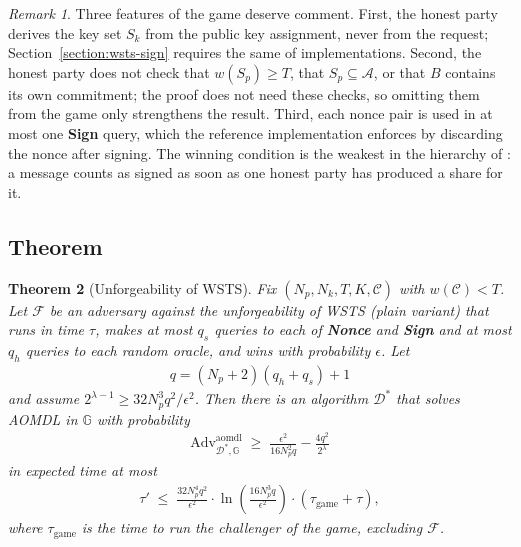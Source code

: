 \documentclass{article}
\theoremstyle{plain}
\newtheorem{thm}{Theorem}[section]
\theoremstyle{definition}
\theoremstyle{remark}
\newtheorem{rem}[thm]{Remark}
\begin{document}
\begin{rem}\label{remark:game}
  Three features of the game deserve comment.  First, the honest party derives the key set $S_k$ from the public key assignment, never from the request; Section~\ref{section:wsts-sign} requires the same of implementations.  Second, the honest party does not check that $w(S_p) \ge T$, that $S_p \subseteq \mathcal{A}$, or that $B$ contains its own commitment; the proof does not need these checks, so omitting them from the game only strengthens the result.  Third, each nonce pair is used in at most one \textbf{Sign} query, which the reference implementation enforces by discarding the nonce after signing.  The winning condition is the weakest in the hierarchy of \cite{btz22}: a message counts as signed as soon as one honest party has produced a share for it.
\end{rem}

\subsection{
  Theorem
}

\begin{thm}[Unforgeability of WSTS]\label{theorem:wsts}
  Fix $(N_p, N_k, T, K, \mathcal{C})$ with $w(\mathcal{C}) < T$.  Let $\mathcal{F}$ be an adversary against the unforgeability of WSTS (plain variant) that runs in time $\tau$, makes at most $q_s$ queries to each of \textbf{Nonce} and \textbf{Sign} and at most $q_h$ queries to each random oracle, and wins with probability $\epsilon$.  Let
  \begin{align}
    q = (N_p + 2)(q_h + q_s) + 1
  \end{align}
  and assume $2^{\lambda - 1} \ge 32 N_p^3 q^2 / \epsilon^2$.  Then there is an algorithm $\mathcal{D}^*$ that solves AOMDL in $\mathbb{G}$ with probability
  \begin{align}\label{equation:theorem-advantage}
    \mathrm{Adv}^{\mathrm{aomdl}}_{\mathcal{D}^*, \mathbb{G}} \;\ge\; \frac{\epsilon^2}{16 N_p^2 q} - \frac{4q^2}{2^{\lambda}}
  \end{align}
  in expected time at most
  \begin{align}\label{equation:theorem-time}
    \tau' \;\le\; \frac{32 N_p^4 q^2}{\epsilon^2} \cdot \ln\!\left(\frac{16 N_p^3 q}{\epsilon^2}\right) \cdot (\tau_{\mathrm{game}} + \tau),
  \end{align}
  where $\tau_{\mathrm{game}}$ is the time to run the challenger of the game, excluding $\mathcal{F}$.
\end{thm}
\end{document}
